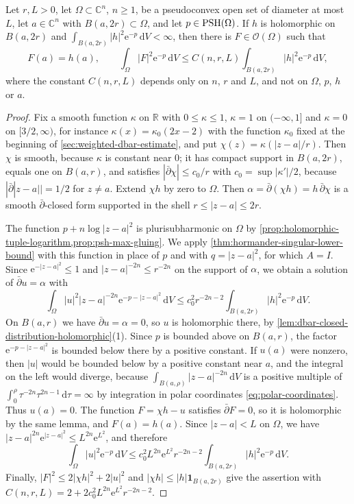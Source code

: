 \begin{proposition}\label{prop:logarithmic-point-interpolation}
Let $r,L>0$, let $\Omega\subset\mathbb C^n$, $n\ge1$, be a pseudoconvex open set of diameter at most $L$, let $a\in\mathbb C^n$ with $B(a,2r)\subset\Omega$, and let $p\in\mathrm{PSH}(\Omega)$. If $h$ is holomorphic on $B(a,2r)$ and $\int_{B(a,2r)}|h|^2\mathrm e^{-p}\,\mathrm dV<\infty$, then there is $F\in\mathcal O(\Omega)$ such that
\[
 F(a)=h(a),\qquad
 \int_\Omega|F|^2\mathrm e^{-p}\,\mathrm dV\le C(n,r,L)
                         \int_{B(a,2r)}|h|^2\mathrm e^{-p}\,\mathrm dV,
\]
where the constant $C(n,r,L)$ depends only on $n$, $r$ and $L$, and not on $\Omega$, $p$, $h$ or $a$.
\end{proposition}
\begin{proof}
Fix a smooth function $\kappa$ on $\mathbb R$ with $0\le\kappa\le1$, $\kappa=1$ on $(-\infty,1]$ and $\kappa=0$ on $[3/2,\infty)$, for instance $\kappa(x)=\kappa_0(2x-2)$ with the function $\kappa_0$ fixed at the beginning of \cref{sec:weighted-dbar-estimate}, and put $\chi(z)=\kappa(|z-a|/r)$. Then $\chi$ is smooth, because $\kappa$ is constant near $0$; it has compact support in $B(a,2r)$, equals one on $B(a,r)$, and satisfies $|\bar\partial\chi|\le c_0/r$ with $c_0=\sup|\kappa'|/2$, because $|\bar\partial|z-a||=1/2$ for $z\ne a$. Extend $\chi h$ by zero to $\Omega$. Then $\alpha=\bar\partial(\chi h)=h\,\bar\partial\chi$ is a smooth $\bar\partial$-closed form supported in the shell $r\le|z-a|\le2r$.

The function $p+n\log|z-a|^2$ is plurisubharmonic on $\Omega$ by \cref{prop:holomorphic-tuple-logarithm,prop:psh-max-gluing}. We apply \cref{thm:hormander-singular-lower-bound} with this function in place of $p$ and with $q=|z-a|^2$, for which $A=I$. Since $\mathrm e^{-|z-a|^2}\le1$ and $|z-a|^{-2n}\le r^{-2n}$ on the support of $\alpha$, we obtain a solution of $\bar\partial u=\alpha$ with
\[
 \int_\Omega |u|^2|z-a|^{-2n}\mathrm e^{-p-|z-a|^2}\,\mathrm dV
    \le c_0^2r^{-2n-2}\int_{B(a,2r)}|h|^2\mathrm e^{-p}\,\mathrm dV.
\]
On $B(a,r)$ we have $\bar\partial u=\alpha=0$, so $u$ is holomorphic there, by \cref{lem:dbar-closed-distribution-holomorphic}(1). Since $p$ is bounded above on $B(a,r)$, the factor $\mathrm e^{-p-|z-a|^2}$ is bounded below there by a positive constant. If $u(a)$ were nonzero, then $|u|$ would be bounded below by a positive constant near $a$, and the integral on the left would diverge, because $\int_{B(a,\rho)}|z-a|^{-2n}\,\mathrm dV$ is a positive multiple of $\int_0^\rho\tau^{-2n}\tau^{2n-1}\,\mathrm d\tau=\infty$ by integration in polar coordinates \eqref{eq:polar-coordinates}. Thus $u(a)=0$. The function $F=\chi h-u$ satisfies $\bar\partial F=0$, so it is holomorphic by the same lemma, and $F(a)=h(a)$. Since $|z-a|<L$ on $\Omega$, we have $|z-a|^{2n}\mathrm e^{|z-a|^2}\le L^{2n}\mathrm e^{L^2}$, and therefore
\[
 \int_\Omega|u|^2\mathrm e^{-p}\,\mathrm dV\le c_0^2L^{2n}\mathrm e^{L^2}r^{-2n-2}\int_{B(a,2r)}|h|^2\mathrm e^{-p}\,\mathrm dV.
\]
Finally, $|F|^2\le2|\chi h|^2+2|u|^2$ and $|\chi h|\le|h|\mathbf 1_{B(a,2r)}$ give the assertion with $C(n,r,L)=2+2c_0^2L^{2n}\mathrm e^{L^2}r^{-2n-2}$.
\end{proof}

